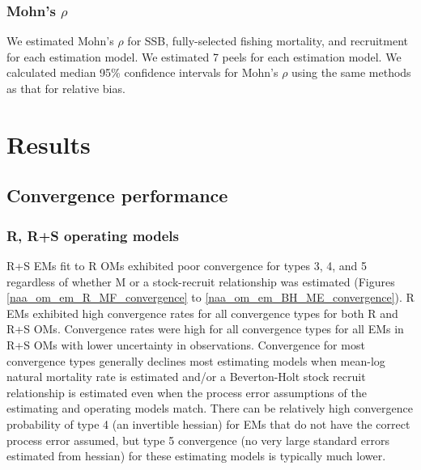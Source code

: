\documentclass[
  12pt,
]{article}
\begin{document}
\hypertarget{mohns-rho}{%
\subsubsection*{\texorpdfstring{Mohn's
\(\rho\)}{Mohn's \textbackslash rho}}\label{mohns-rho}}

We estimated Mohn's \(\rho\) for SSB, fully-selected fishing mortality,
and recruitment for each estimation model. We estimated 7 peels for each
estimation model. We calculated median 95\% confidence intervals for
Mohn's \(\rho\) using the same methods as that for relative bias.

\hypertarget{results}{%
\section*{Results}\label{results}}

\hypertarget{convergence-performance}{%
\subsection*{Convergence performance}\label{convergence-performance}}

\hypertarget{r-rs-operating-models}{%
\subsubsection*{R, R+S operating models}\label{r-rs-operating-models}}

R+S EMs fit to R OMs exhibited poor convergence for types 3, 4, and 5
regardless of whether M or a stock-recruit relationship was estimated
(Figures \ref{naa_om_em_R_MF_convergence} to
\ref{naa_om_em_BH_ME_convergence}). R EMs exhibited high convergence
rates for all convergence types for both R and R+S OMs. Convergence
rates were high for all convergence types for all EMs in R+S OMs with
lower uncertainty in observations. Convergence for most convergence
types generally declines most estimating models when mean-log natural
mortality rate is estimated and/or a Beverton-Holt stock recruit
relationship is estimated even when the process error assumptions of the
estimating and operating models match. There can be relatively high
convergence probability of type 4 (an invertible hessian) for EMs that
do not have the correct process error assumed, but type 5 convergence
(no very large standard errors estimated from hessian) for these
estimating models is typically much lower.
\end{document}
